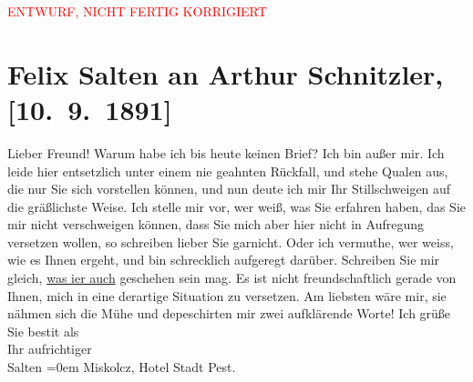 
\begin{center}
            \textcolor{red}{ENTWURF, NICHT FERTIG KORRIGIERT}
                      \end{center}
            
         \renewcommand{\erwaehnteOrte}{Orte: Hotel Stadt Pest, Miskolc, Wien}
         \renewcommand{\erwaehnteWerke}{}
               \section[Felix Salten an Arthur Schnitzler, {[}10. 9. 1891{]}]{ Felix Salten an Arthur Schnitzler, {[}10. 9. 1891{]}}\nopagebreak{}\rehead{ }\begin{ledgroupsized}[t]{13cm}\normalsize\beginnumbering \toendnotes[C]{\smallbreak\pagebreak[2]} 
\pstart
           \noindent{}{\pb}Lieber Freund! Warum habe ich bis heute keinen Brief? Ich bin außer
               mir. \pend
           \pstart
           Ich leide hier entsetzlich unter einem nie geahnten Rückfall, und stehe Qualen aus,
               die nur Sie sich vorstellen können, und nun deute ich mir Ihr Stillschweigen auf die
               gräßlichste Weise. Ich stelle mir vor, wer weiß, was Sie erfahren haben,  das Sie mir nicht verschweigen können, dass Sie mich
               aber hier nicht in Aufregung versetzen wollen, so schreiben lieber Sie garnicht. Oder
               ich vermuthe, wer weiss, wie es Ihnen  ergeht, und
               bin schrecklich aufgeregt darüber. Schreiben Sie mir gleich, \uline{was i{\geminationm}er auch} geschehen sein mag. \pend
           \pstart
           Es ist nicht freundschaftlich gerade von {\pb}Ihnen, mich in eine derartige
               Situation zu versetzen. Am liebsten wäre mir, sie nähmen sich die Mühe und
               depeschirten mir zwei aufklärende Worte!\pend
           \pstart
           Ich grüße Sie besti{\geminationm}t als{\\[\baselineskip]}Ihr aufrichtiger{\\[\baselineskip]}\spacefill\mbox{Salten}\pend
           \leftskip=0em{}\pstart
           Miskolcz, Hotel Stadt Pest.\pend
           
         
         \endnumbering{}\end{ledgroupsized}\begin{anhang}\end{anhang}\newcommand{\dateiname}{L03104}\newcommand{\titel}{Felix Salten an Arthur Schnitzler, [10. 9. 1891]}\newcommand{\editorInnen}{Martin Anton Müller und Laura Untner}
      